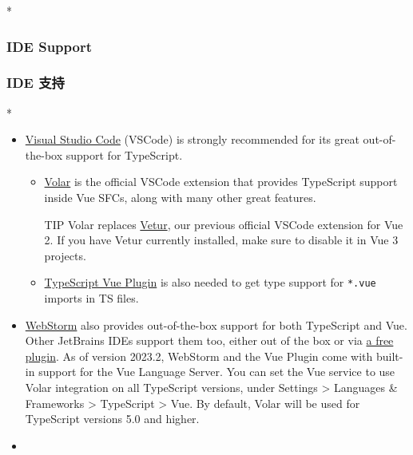 \begin{paracol}{2} 
 
\switchcolumn[0]*%
\subsubsection{IDE Support}
\switchcolumn
\subsubsection{IDE 支持}
\switchcolumn[0]*%
\begin{itemize}
\item
  \href{https://code.visualstudio.com/}{Visual Studio Code} (VSCode) is
  strongly recommended for its great out-of-the-box support for
  TypeScript.
  \begin{itemize}
  \item
    \href{https://marketplace.visualstudio.com/items?itemName=Vue.volar}{Volar}
    is the official VSCode extension that provides TypeScript support
    inside Vue SFCs, along with many other great features.
\begin{vueQuote}{TIP}
    Volar replaces
    \href{https://marketplace.visualstudio.com/items?itemName=octref.vetur}{Vetur},
    our previous official VSCode extension for Vue 2. If you have Vetur
    currently installed, make sure to disable it in Vue 3 projects.
\end{vueQuote} 
  \item
    \href{https://marketplace.visualstudio.com/items?itemName=Vue.vscode-typescript-vue-plugin}{TypeScript
    Vue Plugin} is also needed to get type support for \texttt{*.vue}
    imports in TS files.
  \end{itemize}
\item
  \href{https://www.jetbrains.com/webstorm/}{WebStorm} also provides
  out-of-the-box support for both TypeScript and Vue. Other JetBrains
  IDEs support them too, either out of the box or via
  \href{https://plugins.jetbrains.com/plugin/9442-vue-js}{a free
  plugin}. As of version 2023.2, WebStorm and the Vue Plugin come with
  built-in support for the Vue Language Server. You can set the Vue
  service to use Volar integration on all TypeScript versions, under
  Settings \textgreater{} Languages \& Frameworks \textgreater{}
  TypeScript \textgreater{} Vue. By default, Volar will be used for
  TypeScript versions 5.0 and higher.
\end{itemize}
\switchcolumn
\begin{itemize}
\item

\end{itemize}
\end{paracol}
